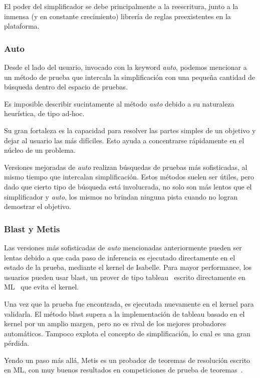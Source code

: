 \documentclass[12pt]{book}
\begin{document}
El poder del simplificador se debe principalmente a la reescritura, junto a la inmensa (y en constante crecimiento) librería de reglas preexistentes en la plataforma.


\subsubsection{Auto}\label{sec:auto}

Desde el lado del usuario, invocado con la keyword \textit{auto}, podemos mencionar a un método de prueba que intercala la simplificación con una pequeña cantidad de búsqueda dentro del espacio de pruebas.

Es imposible describir sucintamente al método \textit{auto} debido a su naturaleza heurística, de tipo ad-hoc.

Su gran fortaleza es la capacidad para resolver las partes simples de un objetivo y dejar al usuario las más difíciles. Esto ayuda a concentrarse rápidamente en el núcleo de un problema.

Versiones mejoradas de \textit{auto} realizan búsquedas de pruebas más sofisticadas, al mismo tiempo que intercalan simplificación. Estos métodos suelen ser útiles, pero dado que cierto tipo de búsqueda está involucrada, no solo son más lentos que el
simplificador y \textit{auto}, los mismos no brindan ninguna pista cuando no logran demostrar el objetivo.


\subsubsection{Blast y Metis}
Las versiones más sofisticadas de \textit{auto} mencionadas anteriormente pueden ser lentas debido a que cada paso de inferencia es ejecutado directamente en el estado de la prueba, mediante el kernel de Isabelle.
Para mayor performance, los usuarios pueden usar blast, un prover de tipo tableau~\cite{tableau_provers} escrito directamente en ML~\cite{ML_programming_language} que evita el kernel.

Una vez que la prueba fue encontrada, es ejecutada nuevamente en el kernel para validarla. El método blast supera a la implementación de tableau basado en el kernel por un amplio margen, pero no es rival de los mejores probadores automáticos. Tampoco explota el concepto de simplificación, lo cual es una gran pérdida.

Yendo un paso más allá, Metis es un probador de teoremas de resolución escrito en ML, con muy buenos resultados en competiciones de prueba de teoremas~\cite{CASC_competition}.
\end{document}
